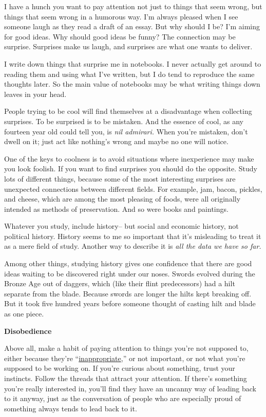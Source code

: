 I have a hunch you want to pay attention not just to things that seem
wrong, but things that seem wrong in a humorous way. I'm always pleased
when I see someone laugh as they read a draft of an essay. But why
should I be? I'm aiming for good ideas. Why should good ideas be funny?
The connection may be surprise. Surprises make us laugh, and surprises
are what one wants to deliver.

I write down things that surprise me in notebooks. I never actually get
around to reading them and using what I've written, but I do tend to
reproduce the same thoughts later. So the main value of notebooks may be
what writing things down leaves in your head.

People trying to be cool will find themselves at a disadvantage when
collecting surprises. To be surprised is to be mistaken. And the essence
of cool, as any fourteen year old could tell you, is \emph{nil
admirari.} When you're mistaken, don't dwell on it; just act like
nothing's wrong and maybe no one will notice.

One of the keys to coolness is to avoid situations where inexperience
may make you look foolish. If you want to find surprises you should do
the opposite. Study lots of different things, because some of the most
interesting surprises are unexpected connections between different
fields. For example, jam, bacon, pickles, and cheese, which are among
the most pleasing of foods, were all originally intended as methods of
preservation. And so were books and paintings.

Whatever you study, include history-- but social and economic history,
not political history. History seems to me so important that it's
misleading to treat it as a mere field of study. Another way to describe
it is \emph{all the data we have so far.}

Among other things, studying history gives one confidence that there are
good ideas waiting to be discovered right under our noses. Swords
evolved during the Bronze Age out of daggers, which (like their flint
predecessors) had a hilt separate from the blade. Because swords are
longer the hilts kept breaking off. But it took five hundred years
before someone thought of casting hilt and blade as one piece.

\textbf{Disobedience}

Above all, make a habit of paying attention to things you're not
supposed to, either because they're ``\href{say.html}{inappropriate},''
or not important, or not what you're supposed to be working on. If
you're curious about something, trust your instincts. Follow the threads
that attract your attention. If there's something you're really
interested in, you'll find they have an uncanny way of leading back to
it anyway, just as the conversation of people who are especially proud
of something always tends to lead back to it.


